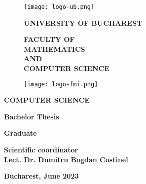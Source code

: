 \begin{titlepage}


\begin{figure}[!htb]
    \centering
    \begin{minipage}{0.2\textwidth}
        \texttt{[image: logo-ub.png]}
    \end{minipage}
    \begin{minipage}{0.5\textwidth}
        \large
        \vspace{-0.35cm}
        \begin{center}
            \textbf{UNIVERSITY OF BUCHAREST}
        \end{center}
        \vspace{-0.45cm}
        \begin{center}
            \textbf{
                FACULTY OF \\
                MATHEMATICS \\
                AND \\
                COMPUTER SCIENCE
            }
        \end{center}
    \end{minipage}
    \begin{minipage}{0.2\textwidth}
        \texttt{[image: logo-fmi.png]}
    \end{minipage}
\end{figure}

\vspace{1.5cm}

\begin{center}
\textbf{COMPUTER SCIENCE}
\end{center}

\vspace{1cm}

\begin{center}
\Large \textbf{Bachelor Thesis}
\end{center}

\vspace{1cm}

\begin{center}
\huge \textbf{\MakeUppercase{\@title}}
\end{center}

\vspace{2cm}

\begin{center}
\large \textbf{Graduate \\ \@author}
\end{center}

\vspace{0.25cm}

\begin{center}
\large \textbf{Scientific coordinator \\ Lect. Dr. Dumitru Bogdan Costinel}
\end{center}

\vspace{1.5cm}

\begin{center}
\Large \textbf{Bucharest, June 2023}
\end{center}
\end{titlepage}